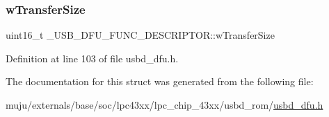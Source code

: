 \subsubsection{\texorpdfstring{w\+Transfer\+Size}{wTransferSize}}
{\footnotesize\ttfamily uint16\+\_\+t \+\_\+\+U\+S\+B\+\_\+\+D\+F\+U\+\_\+\+F\+U\+N\+C\+\_\+\+D\+E\+S\+C\+R\+I\+P\+T\+O\+R\+::w\+Transfer\+Size}



Definition at line 103 of file usbd\+\_\+dfu.\+h.



The documentation for this struct was generated from the following file\+:\begin{DoxyCompactItemize}
\item 
muju/externals/base/soc/lpc43xx/lpc\+\_\+chip\+\_\+43xx/usbd\+\_\+rom/\hyperlink{usbd__dfu_8h}{usbd\+\_\+dfu.\+h}\end{DoxyCompactItemize}
